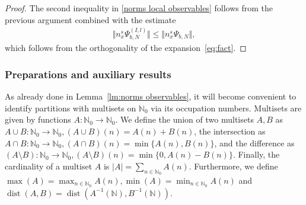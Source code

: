 \documentclass[letterpaper, DIV=17]{scrartcl}
\numberwithin{equation}{section}
\theoremstyle{definition}
\DeclareMathOperator{\dist}{dist}
\begin{document}
\begin{proof}
	The second inequality in \eqref{norms local observables} follows from the previous argument combined with the estimate
	\begin{align*}
		\Vert n_x^s \Psi_{b,N}^{(I, l)} \Vert \leq \Vert n_x^s \Psi_{b,N}\Vert ,
	\end{align*}
	which follows from the orthogonality of the expansion~\eqref{eq:fact}. 
\end{proof}

\subsubsection{Preparations and auxiliary results}
As already done in Lemma~\ref{lm:norms observables}, it will become convenient to identify partitions with multisets on $\mathbb{N}_0$ via its occupation numbers.  
Multisets are given by functions $A:\mathbb{N}_0\rightarrow \mathbb{N}_0$. We define the union of two multisets $A,B$ as $A\cup B: \mathbb{N}_0\rightarrow \mathbb{N}_0, (A\cup B)(n)=A(n)+B(n)$, the intersection as $A\cap B: \mathbb{N}_0\rightarrow \mathbb{N}_0, (A\cap B)(n)=\min\{A(n), B(n)\}$, and the difference as $(A\setminus B) : \mathbb{N}_0\rightarrow \mathbb{N}_0, (A\setminus B)(n)=\min\{0, A(n)-B(n)\}$. Finally, the cardinality of a multiset $A$ is $\vert A \vert = \sum_{n\in \mathbb{N}_0} A(n)$. Furthermore, we define $\max (A)=\max_{n\in \mathbb{N}_0} A(n), \min (A)=\min_{n\in \mathbb{N}_0} A(n)$ and $\dist(A,B)=\dist(A^{-1}(\mathbb{N}), B^{-1}(\mathbb{N}))$.\\
\end{document}

